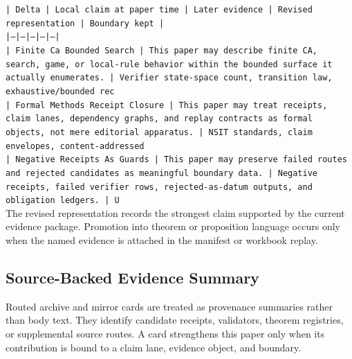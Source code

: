 \documentclass[11pt]{article}
\begin{document}
\noindent\texttt{| Delta | Local claim at paper time | Later evidence | Revised representation | Boundary kept |}\\
\noindent\texttt{|---|---|---|---|---|}\\
\noindent\texttt{| Finite Ca Bounded Search | This paper may describe finite CA, search, game, or local-rule behavior within the bounded surface it actually enumerates. | Verifier state-space count, transition law, exhaustive/bounded rec}\\
\noindent\texttt{| Formal Methods Receipt Closure | This paper may treat receipts, claim lanes, dependency graphs, and replay contracts as formal objects, not mere editorial apparatus. | NSIT standards, claim envelopes, content-addressed}\\
\noindent\texttt{| Negative Receipts As Guards | This paper may preserve failed routes and rejected candidates as meaningful boundary data. | Negative receipts, failed verifier rows, rejected-as-datum outputs, and obligation ledgers. | U}\\

The revised representation records the strongest claim supported by the current evidence package. Promotion into theorem or proposition language occurs only when the named evidence is attached in the manifest or workbook replay.

\subsection*{Source-Backed Evidence Summary}

Routed archive and mirror cards are treated as provenance summaries rather than
body text. They identify candidate receipts, validators, theorem registries, or
supplemental source routes. A card strengthens this paper only when its
contribution is bound to a claim lane, evidence object, and boundary.
\end{document}
